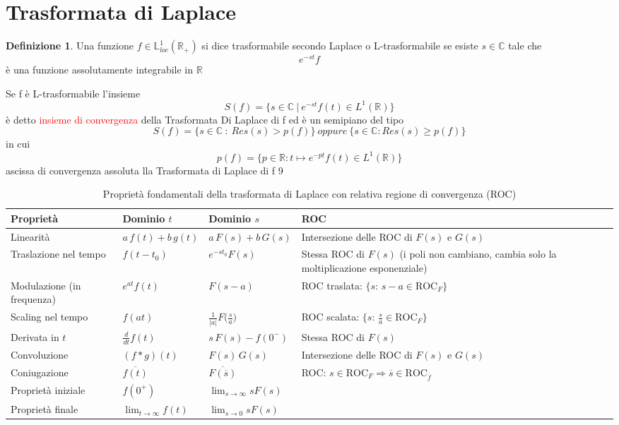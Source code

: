 \documentclass{article}
\theoremstyle{definition}
\newtheorem*{definizione}{Definizione}
\newcommand{\R}{\mathbb{R}}
\newcommand{\C}{\mathbb{C}}
\renewcommand{\arraystretch}{1.5} %
\begin{document}
\section{Trasformata di Laplace}
\begin{definizione}
	Una funzione $f \in \mathbb{L}_{loc}^1(\R_+)$ si dice trasformabile secondo Laplace o L-trasformabile se esiste $s \in \C$ tale che 
	$$e^{-st}f$$ è una funzione assolutamente integrabile in $\R$
\end{definizione}
Se f è L-trasformabile l'insieme 
$$S(f)=\{s\in \C \ |\ e^{-st}f(t) \in L^1(\R) \}$$
è detto \textcolor{red}{insieme di convergenza} della Trasformata Di Laplace di f ed è un semipiano del tipo 
$$S(f)=\{s \in \C \ : \ Res(s)>p(f)\} \ oppure \ \{s \in \C : Res(s) \geq p(f) \}$$
in cui 
$$p(f)=\{p\in \R : t \mapsto e^{-pt}f(t) \in L^1(\R)\}$$
ascissa di convergenza assoluta lla Trasformata di Laplace di f 9
\begin{table}[h!]
	\centering
	\renewcommand{\arraystretch}{1.3} %
	\begin{tabularx}{\textwidth}{@{} l l l X @{} }
		\toprule
		\textbf{Proprietà} & \textbf{Dominio $t$} & \textbf{Dominio $s$} & \textbf{ROC} \\
		\midrule
		Linearità & $a\,f(t) + b\,g(t)$ & $a\,F(s) + b\,G(s)$ & Intersezione delle ROC di $F(s)$ e $G(s)$ \\
		Traslazione nel tempo & $f(t - t_0)$ & $e^{-s t_0}F(s)$ & Stessa ROC di $F(s)$ (i poli non cambiano, cambia solo la moltiplicazione esponenziale) \\
		Modulazione (in frequenza) & $e^{a t}f(t)$ & $F(s - a)$ & ROC traslata: $\{s:\,s - a\in\mathrm{ROC}_{F}\}$ \\
		Scaling nel tempo & $f(a t)$ & $\frac{1}{|a|}F\bigl(\tfrac{s}{a}\bigr)$ & ROC scalata: $\{s:\,\tfrac{s}{a}\in\mathrm{ROC}_{F}\}$ \\
		Derivata in $t$ & $\frac{d}{dt}f(t)$ & $s\,F(s) - f(0^-)$ & Stessa ROC di $F(s)$ \\
		Convoluzione & $(f * g)(t)$ & $F(s)\,G(s)$ & Intersezione delle ROC di $F(s)$ e $G(s)$ \\
		Coniugazione & $\overline{f(t)}$ & $\overline{F(\overline{s})}$ & ROC: $s\in \text{ROC}_F \Rightarrow \overline{s}\in \text{ROC}_{\overline{f}}$ \\
		Proprietà iniziale & $f(0^+)$ & $\displaystyle\lim_{s\to\infty}sF(s)$ &  \\
		Proprietà finale & $\displaystyle\lim_{t\to\infty}f(t)$ & $\displaystyle\lim_{s\to 0}sF(s)$ &   \\
		\bottomrule
	\end{tabularx}
	\caption{Proprietà fondamentali della trasformata di Laplace con relativa regione di convergenza (ROC)}
	\label{tab:prop_laplace_roc}
\end{table}
\end{document}
